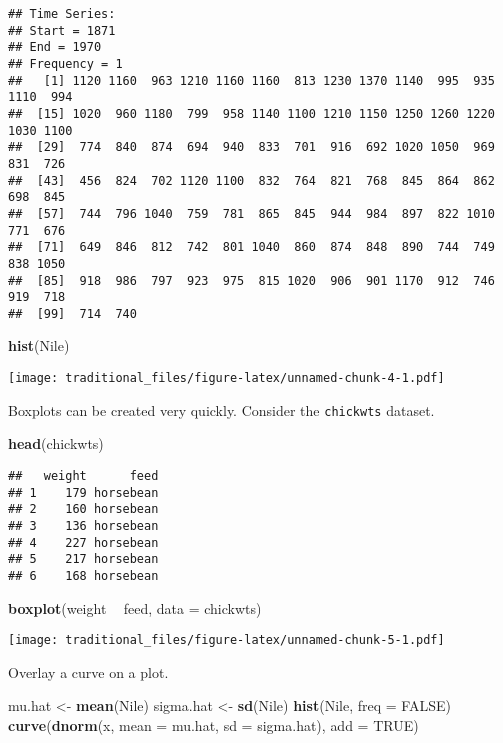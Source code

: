 \documentclass[]{article}
\newenvironment{Shaded}{\begin{snugshade}}{\end{snugshade}}
\newcommand{\KeywordTok}[1]{\textcolor[rgb]{0.13,0.29,0.53}{\textbf{#1}}}
\newcommand{\DataTypeTok}[1]{\textcolor[rgb]{0.13,0.29,0.53}{#1}}
\newcommand{\StringTok}[1]{\textcolor[rgb]{0.31,0.60,0.02}{#1}}
\newcommand{\OtherTok}[1]{\textcolor[rgb]{0.56,0.35,0.01}{#1}}
\newcommand{\OperatorTok}[1]{\textcolor[rgb]{0.81,0.36,0.00}{\textbf{#1}}}
\newcommand{\NormalTok}[1]{#1}
\begin{document}
\begin{verbatim}
## Time Series:
## Start = 1871 
## End = 1970 
## Frequency = 1 
##   [1] 1120 1160  963 1210 1160 1160  813 1230 1370 1140  995  935 1110  994
##  [15] 1020  960 1180  799  958 1140 1100 1210 1150 1250 1260 1220 1030 1100
##  [29]  774  840  874  694  940  833  701  916  692 1020 1050  969  831  726
##  [43]  456  824  702 1120 1100  832  764  821  768  845  864  862  698  845
##  [57]  744  796 1040  759  781  865  845  944  984  897  822 1010  771  676
##  [71]  649  846  812  742  801 1040  860  874  848  890  744  749  838 1050
##  [85]  918  986  797  923  975  815 1020  906  901 1170  912  746  919  718
##  [99]  714  740
\end{verbatim}

\begin{Shaded}
\begin{Highlighting}[]
\KeywordTok{hist}\NormalTok{(Nile)}
\end{Highlighting}
\end{Shaded}

\texttt{[image: traditional\_files/figure-latex/unnamed-chunk-4-1.pdf]}

Boxplots can be created very quickly. Consider the \texttt{chickwts}
dataset.

\begin{Shaded}
\begin{Highlighting}[]
\KeywordTok{head}\NormalTok{(chickwts)}
\end{Highlighting}
\end{Shaded}

\begin{verbatim}
##   weight      feed
## 1    179 horsebean
## 2    160 horsebean
## 3    136 horsebean
## 4    227 horsebean
## 5    217 horsebean
## 6    168 horsebean
\end{verbatim}

\begin{Shaded}
\begin{Highlighting}[]
\KeywordTok{boxplot}\NormalTok{(weight }\OperatorTok{~}\StringTok{ }\NormalTok{feed, }\DataTypeTok{data =}\NormalTok{ chickwts)}
\end{Highlighting}
\end{Shaded}

\texttt{[image: traditional\_files/figure-latex/unnamed-chunk-5-1.pdf]}

Overlay a curve on a plot.

\begin{Shaded}
\begin{Highlighting}[]
\NormalTok{mu.hat <-}\StringTok{ }\KeywordTok{mean}\NormalTok{(Nile)}
\NormalTok{sigma.hat <-}\StringTok{ }\KeywordTok{sd}\NormalTok{(Nile)}
\KeywordTok{hist}\NormalTok{(Nile, }\DataTypeTok{freq =} \OtherTok{FALSE}\NormalTok{)}
\KeywordTok{curve}\NormalTok{(}\KeywordTok{dnorm}\NormalTok{(x, }\DataTypeTok{mean =}\NormalTok{ mu.hat, }\DataTypeTok{sd =}\NormalTok{ sigma.hat), }\DataTypeTok{add =} \OtherTok{TRUE}\NormalTok{)}
\end{Highlighting}
\end{Shaded}
\end{document}

